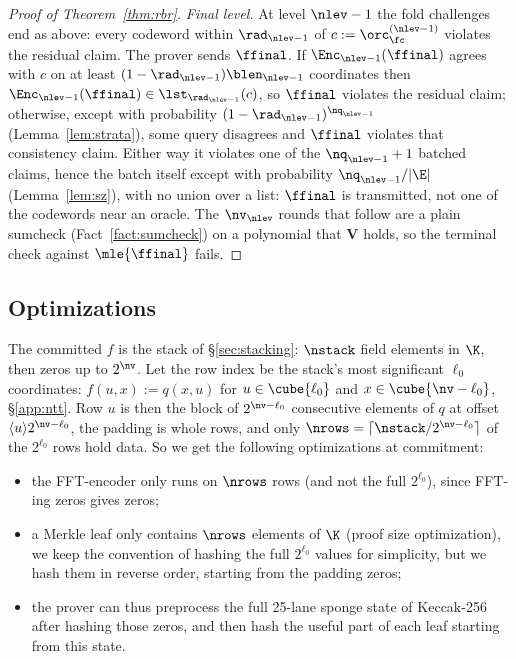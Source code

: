 \begin{proof}[Proof of Theorem~\ref{thm:rbr}]
\medskip\noindent\emph{Final level.}
At level $\nlev - 1$ the fold challenges end as above: every codeword within $\rad_{\nlev-1}$ of $c := \orc^{(\nlev-1)}_\fc$ violates the residual claim. The prover sends $\ffinal$. If $\Enc_{\nlev-1}(\ffinal)$ agrees with $c$ on at least $(1 - \rad_{\nlev-1}) \blen_{\nlev-1}$ coordinates then $\Enc_{\nlev-1}(\ffinal) \in \lst_{\rad_{\nlev-1}}(c)$, so $\ffinal$ violates the residual claim; otherwise, except with probability $(1 - \rad_{\nlev-1})^{\nq_{\nlev-1}}$ (Lemma~\ref{lem:strata}), some query disagrees and $\ffinal$ violates that consistency claim. Either way it violates one of the $\nq_{\nlev-1}+1$ batched claims, hence the batch itself except with probability $\nq_{\nlev-1}/|\E|$ (Lemma~\ref{lem:sz}), with no union over a list: $\ffinal$ is transmitted, not one of the codewords near an oracle. The $\nv_\nlev$ rounds that follow are a plain sumcheck (Fact~\ref{fact:sumcheck}) on a polynomial that $\mathbf{V}$ holds, so the terminal check against $\mle{\ffinal}$ fails.

\end{proof}


\subsection{Optimizations}\label{sec:pcs-opt}

The committed $f$ is the stack of \S\ref{sec:stacking}: $\nstack$ field elements in $\K$, then zeros up to $2^{\nv}$. Let the row index be the stack's most significant $\ell_0$ coordinates: $f(u, x) := q(x, u)$ for $u \in \cube{\ell_0}$ and $x \in \cube{\nv - \ell_0}$, \S\ref{app:ntt}. Row $u$ is then the block of $2^{\nv - \ell_0}$ consecutive elements of $q$ at offset $\langle u \rangle 2^{\nv - \ell_0}$, the padding is whole rows, and only $\nrows=\lceil\nstack/2^{\nv-\ell_0}\rceil$ of the $2^{\ell_0}$ rows hold data. So we get the following optimizations at commitment:
\begin{itemize}[itemsep=1pt,topsep=2pt]
\item the FFT-encoder only runs on $\nrows$ rows (and not the full $2^{\ell_0}$), since FFT-ing zeros gives zeros;
\item a Merkle leaf only contains $\nrows$ elements of $\K$ (proof size optimization), we keep the convention of hashing the full $2^{\ell_0}$ values for simplicity, but we hash them in reverse order, starting from the padding zeros;
\item the prover can thus preprocess the full 25-lane sponge state of Keccak-256 after hashing those zeros, and then hash the useful part of each leaf starting from this state.
\end{itemize}

